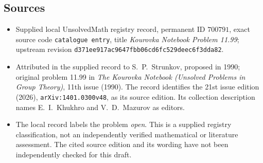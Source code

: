 \documentclass[11pt]{article}
\begin{document}
\subsection{Sources}
\begin{itemize}
\item Supplied local UnsolvedMath registry record, permanent ID \(700791\), exact source code \texttt{catalogue entry}, title \emph{Kourovka Notebook Problem 11.99}; upstream revision \texttt{d371ee917ac9647fbb06cd6fc529deec6f3dda82}.
\item Attributed in the supplied record to S.\ P.\ Strunkov, proposed in 1990; original problem 11.99 in \emph{The Kourovka Notebook (Unsolved Problems in Group Theory)}, 11th issue (1990). The record identifies the 21st issue edition (2026), \texttt{arXiv:1401.0300v48}, as its source edition. Its collection description names E.\ I.\ Khukhro and V.\ D.\ Mazurov as editors.
\item The local record labels the problem \emph{open}. This is a supplied registry classification, not an independently verified mathematical or literature assessment. The cited source edition and its wording have not been independently checked for this draft.
\end{itemize}
\end{document}
